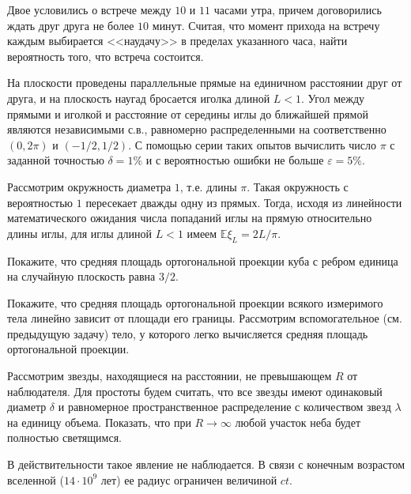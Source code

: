 \begin{problem}
Двое условились о встрече между $10$ и $11$ часами утра, причем договорились ждать друг друга не более $10$ минут. Считая, что 
момент прихода на встречу каждым выбирается <<наудачу>> в пределах указанного часа, найти вероятность того, что встреча состоится. 
\end{problem}


\begin{problem}
На плоскости проведены параллельные прямые на единичном расстоянии друг от друга, и на плоскость наугад бросается иголка длиной $L<1$. 
Угол между прямыми и иголкой и расстояние от середины иглы до ближайшей прямой являются независимыми с.в., равномерно распределенными 
на соответственно $(0,2\pi)$ и $(-1/2,1/2)$. С помощью серии таких опытов вычислить число $\pi$ с заданной точностью 
$\delta=1\%$ и с вероятностью ошибки не больше $\varepsilon=5\%$. 
\end{problem}

\begin{ordre}

Рассмотрим окружность диаметра $1$, т.е. длины $\pi$. Такая окружность с вероятностью $1$ пересекает дважды одну из прямых. 
Тогда, исходя из линейности математического ожидания числа попаданий иглы на прямую относительно длины иглы, для иглы длиной $L<1$ 
имеем ${\mathbb E}\xi_L = 2L/\pi$. 

\end{ordre}



\begin{problem}
Покажите, что средняя площадь ортогональной проекции куба с ребром единица на случайную плоскость равна $3/2$. 
\end{problem}

\begin{ordre}
Покажите, что  средняя площадь  ортогональной проекции всякого измеримого тела 
линейно зависит от площади его границы. 
Рассмотрим вспомогательное (см. предыдущую задачу) тело, у которого легко вычисляется средняя площадь ортогональной проекции. 
\end{ordre}

\begin{problem}
Рассмотрим звезды, находящиеся на расстоянии, не превышающем $R$ от наблюдателя. Для простоты будем считать, что все звезды имеют одинаковый диаметр $\delta$ и равномерное пространственное распределение с количеством звезд $\lambda$ на единицу объема. Показать, что при $R \rightarrow \infty$ любой участок неба будет полностью светящимся.   

\begin{remark}
В действительности такое явление не наблюдается. В связи с конечным возрастом вселенной ($14 \cdot 10^9$ лет) ее радиус ограничен величиной $ct$.
\end{remark}
\end{problem}

